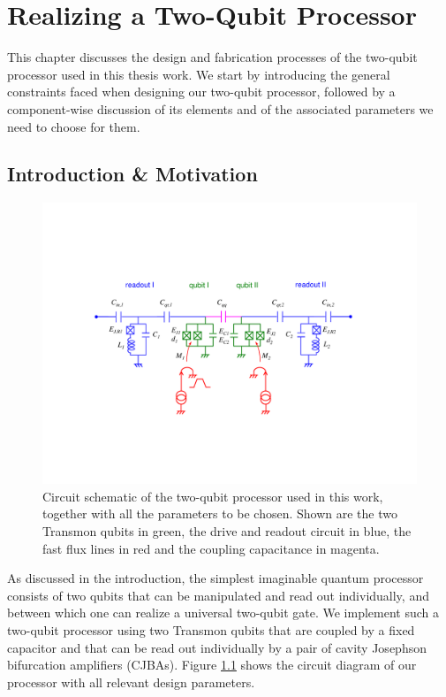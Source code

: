 \chapter{Realizing a Two-Qubit Processor} \label{chapter:design}

This chapter discusses the design and fabrication processes of the two-qubit processor used in this thesis work. We start by introducing the general constraints faced when designing our two-qubit processor, followed by a component-wise discussion of its elements and of the associated parameters we need to choose for them.

\section{Introduction \& Motivation}

\begin{figure}[ht!]
  \centering
	\includegraphics[width=1.\textwidth]{"./material/figures/2-qubit-processor/processor_schematic_parameters"}
	\caption[Circuit schematic of the two-qubit processor]{Circuit schematic of the two-qubit processor used in this work, together with all the parameters to be chosen. Shown are the two Transmon qubits in green, the drive and readout circuit in blue, the fast flux lines in red and the coupling capacitance in magenta.}
	\label{fig:2_qubit_chip_circuit_diagram}
\end{figure}

As discussed in the introduction, the simplest imaginable quantum processor consists of two qubits that can be manipulated and read out individually, and between which one can realize a universal two-qubit gate. We implement such a two-qubit processor using two Transmon qubits that are coupled by a fixed capacitor and that can be read out individually by a pair of cavity Josephson bifurcation amplifiers (CJBAs). Figure \ref{fig:2_qubit_chip_circuit_diagram} shows the circuit diagram of our processor with all relevant design parameters. 

